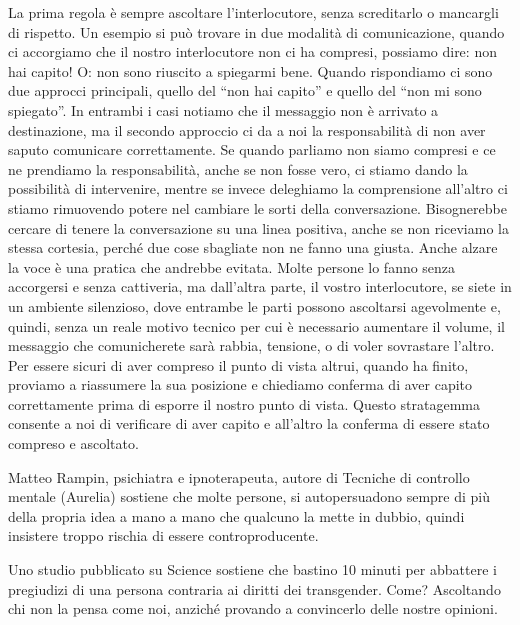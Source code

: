 \documentclass[12pt]{book} %
\begin{document}
La prima regola è sempre ascoltare l'interlocutore, senza screditarlo o mancargli di rispetto. Un
esempio si può trovare in due modalità di comunicazione, quando ci accorgiamo che il nostro interlocutore non ci ha
compresi, possiamo dire: non hai capito! O: non sono riuscito a spiegarmi bene. Quando rispondiamo ci sono due approcci
principali, quello del “non hai capito” e quello del “non mi sono spiegato”. In entrambi i casi notiamo che il
messaggio non è arrivato a destinazione, ma il secondo approccio ci da a noi la responsabilità di non aver saputo
comunicare correttamente. Se quando parliamo non siamo compresi e ce ne prendiamo la responsabilità, anche se non fosse
vero, ci stiamo dando la possibilità di intervenire, mentre se invece deleghiamo la comprensione
all'altro ci stiamo rimuovendo potere nel cambiare le sorti della conversazione. Bisognerebbe
cercare di tenere la conversazione su una linea positiva, anche se non riceviamo la stessa cortesia, perché due cose
sbagliate non ne fanno una giusta. Anche alzare la voce è una pratica che andrebbe evitata. Molte persone lo fanno
senza accorgersi e senza cattiveria, ma dall'altra parte, il vostro interlocutore, se siete in un
ambiente silenzioso, dove entrambe le parti possono ascoltarsi agevolmente e, quindi, senza un reale motivo tecnico per
cui è necessario aumentare il volume, il messaggio che comunicherete sarà rabbia, tensione, o di voler sovrastare
l'altro. Per essere sicuri di aver compreso il punto di vista altrui, quando ha finito, proviamo a
riassumere la sua posizione e chiediamo conferma di aver capito correttamente prima di esporre il nostro punto di
vista. Questo stratagemma consente a noi di verificare di aver capito e all'altro la conferma di
essere stato compreso e ascoltato.

Matteo Rampin, psichiatra e ipnoterapeuta, autore di Tecniche di controllo mentale (Aurelia) sostiene che molte persone,
si autopersuadono sempre di più della propria idea a mano a mano che qualcuno la mette in dubbio, quindi insistere
troppo rischia di essere controproducente.

Uno studio pubblicato su Science sostiene che
bastino 10 minuti per abbattere i pregiudizi di una persona contraria ai diritti dei transgender. Come? Ascoltando chi
non la pensa come noi, anziché provando a convincerlo delle nostre opinioni.
\end{document}
